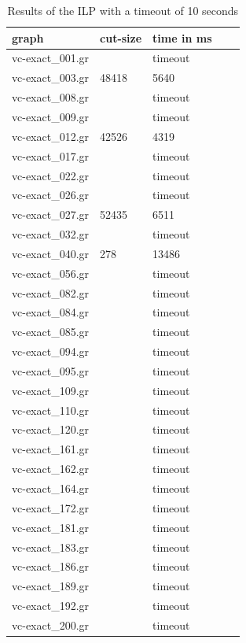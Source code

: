 \documentclass[twocolumn]{article}
\begin{document}
\begin{table}[!ht]
    \centering
    \begin{tabular}{lllll}
    \hline
        graph & cut-size & time in ms \\ \hline
        vc-exact\_001.gr && timeout \\ 
        vc-exact\_003.gr & 48418 & 5640 \\ 
        vc-exact\_008.gr && timeout \\ 
        vc-exact\_009.gr && timeout \\ 
        vc-exact\_012.gr & 42526 & 4319 \\ 
        vc-exact\_017.gr && timeout \\ 
        vc-exact\_022.gr && timeout \\ 
        vc-exact\_026.gr && timeout \\ 
        vc-exact\_027.gr & 52435 & 6511 \\ 
        vc-exact\_032.gr && timeout \\ 
        vc-exact\_040.gr & 278 & 13486 \\ 
        vc-exact\_056.gr && timeout \\ 
        vc-exact\_082.gr && timeout \\ 
        vc-exact\_084.gr && timeout \\ 
        vc-exact\_085.gr && timeout \\ 
        vc-exact\_094.gr && timeout \\ 
        vc-exact\_095.gr && timeout \\ 
        vc-exact\_109.gr && timeout \\ 
        vc-exact\_110.gr && timeout \\ 
        vc-exact\_120.gr && timeout \\ 
        vc-exact\_161.gr && timeout \\ 
        vc-exact\_162.gr && timeout \\ 
        vc-exact\_164.gr && timeout \\ 
        vc-exact\_172.gr && timeout \\ 
        vc-exact\_181.gr && timeout \\ 
        vc-exact\_183.gr && timeout \\ 
        vc-exact\_186.gr && timeout \\ 
        vc-exact\_189.gr && timeout \\ 
        vc-exact\_192.gr && timeout \\ 
        vc-exact\_200.gr && timeout \\ \hline
    \end{tabular}
    \caption{Results of the ILP with a timeout of 10 seconds}
    \label{tbl:ilp_vc}
\end{table}
\end{document}
